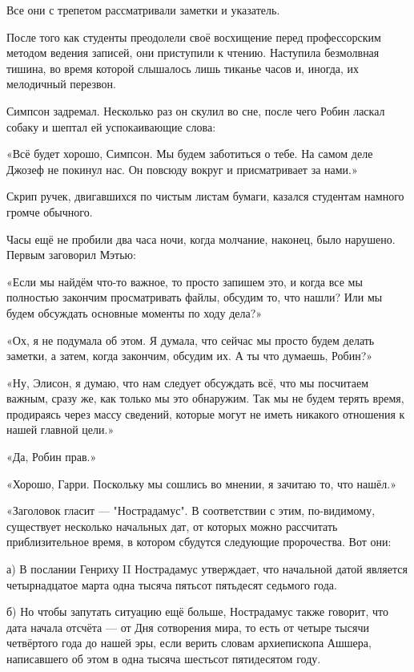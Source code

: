 \documentclass[a4paper,12pt]{book}
\begin{document}
\par
Все они с трепетом рассматривали заметки и указатель.
\par
После того как студенты преодолели своё восхищение перед профессорским методом ведения записей, они приступили к чтению. Наступила безмолвная тишина, во время которой слышалось лишь тиканье часов и, иногда, их мелодичный перезвон.\\
\par
Симпсон задремал. Несколько раз он скулил во сне, после чего Робин ласкал собаку и шептал ей успокаивающие слова:
\par
«Всё будет хорошо, Симпсон. Мы будем заботиться о тебе. На самом деле Джозеф не покинул нас. Он повсюду вокруг и присматривает за нами.»\\
\par
Скрип ручек, двигавшихся по чистым листам бумаги, казался студентам намного громче обычного.
\par
Часы ещё не пробили два часа ночи, когда молчание, наконец, было нарушено. Первым заговорил Мэтью:
\par
«Если мы найдём что-то важное, то просто запишем это, и когда все мы полностью закончим просматривать файлы, обсудим то, что нашли? Или мы будем обсуждать основные моменты по ходу дела?»
\par
«Ох, я не подумала об этом. Я думала, что сейчас мы просто будем делать заметки, а затем, когда закончим, обсудим их. А ты что думаешь, Робин?»
\par
«Ну, Элисон, я думаю, что нам следует обсуждать всё, что мы посчитаем важным, сразу же, как только мы это обнаружим. Так мы не будем терять время, продираясь через массу сведений, которые могут не иметь никакого отношения к нашей главной цели.»
\par
«Да, Робин прав.»
\par
«Хорошо, Гарри. Поскольку мы сошлись во мнении, я зачитаю то, что нашёл.»
\par
«Заголовок гласит — "Нострадамус". В соответствии с этим, по-видимому, существует несколько начальных дат, от которых можно рассчитать приблизительное время, в котором сбудутся следующие пророчества. Вот они:\\
\par
а) В послании Генриху II Нострадамус утверждает, что начальной датой является четырнадцатое марта одна тысяча пятьсот пятьдесят седьмого года.
\par
б) Но чтобы запутать ситуацию ещё больше, Нострадамус также говорит, что дата начала отсчёта — от Дня сотворения мира, то есть от четыре тысячи четвёртого года до нашей эры, если верить словам архиепископа Ашшера, написавшего об этом в одна тысяча шестьсот пятидесятом году.
\end{document}
